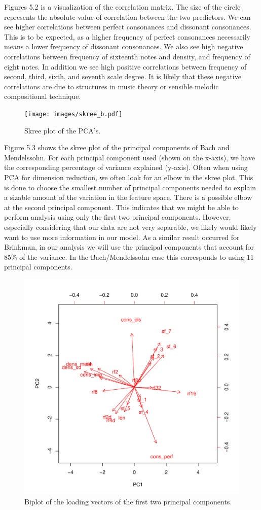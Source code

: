 \documentclass[12pt,twoside]{reedthesis}
\theoremstyle{definition}
\theoremstyle{definition}
\theoremstyle{definition}
\theoremstyle{remark}
\begin{document}
Figures 5.2 is a visualization of the correlation matrix. The size of
the circle represents the absolute value of correlation between the two
predictors. We can see higher correlations between perfect consonances
and dissonant consonances. This is to be expected, as a higher frequency
of perfect consonances necessarily means a lower frequency of dissonant
consonances. We also see high negative correlations between frequency of
sixteenth notes and density, and frequency of eight notes. In addition
we see high positive correlations between frequency of second, third,
sixth, and seventh scale degree. It is likely that these negative
correlations are due to structures in music theory or sensible melodic
compositional technique.
\begin{figure}[H]
\centering
\texttt{[image: images/skree\_b.pdf]}
\caption{Skree plot of the PCA's.}
\label{subd}
\end{figure}
Figure 5.3 shows the skree plot of the principal components of Bach and
Mendelssohn. For each principal component used (shown on the x-axis), we
have the corresponding percentage of variance explained (y-axis). Often
when using PCA for dimension reduction, we often look for an elbow in
the skree plot. This is done to choose the smallest number of principal
components needed to explain a sizable amount of the variation in the
feature space. There is a possible elbow at the second principal
component. This indicates that we might be able to perform analysis
using only the first two principal components. However, especially
considering that our data are not very separable, we likely would likely
want to use more information in our model. As a similar result occurred
for Brinkman, in our analysis we will use the principal components that
account for 85\% of the variance. In the Bach/Mendelssohn case this
corresponds to using 11 principal components.
\begin{figure}[H]
\centering
\includegraphics[scale = .7]{images/biplot_b.pdf}
\caption{Biplot of the loading vectors of the first two principal components.}
\label{subd}
\end{figure}
\end{document}
